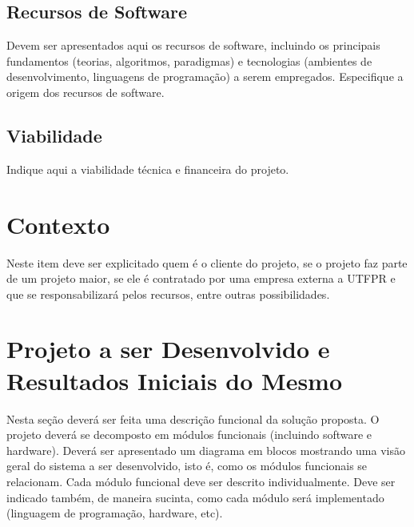 \documentclass[a4paper,12pt]{article}
\begin{document}
\subsection{Recursos de Software}
Devem ser apresentados aqui os recursos de software, incluindo os principais fundamentos (teorias, algoritmos, paradigmas) e tecnologias (ambientes de desenvolvimento, linguagens de programação) a serem empregados. Especifique a origem dos recursos de software.

\subsection{Viabilidade}
Indique aqui a viabilidade técnica e financeira do projeto.

\section{Contexto}
Neste item deve ser explicitado quem é o cliente do projeto, se o projeto faz parte de um projeto maior, se ele é contratado por uma empresa externa a UTFPR e que se responsabilizará pelos recursos, entre outras possibilidades.

\section{Projeto a ser Desenvolvido e Resultados Iniciais do Mesmo}
Nesta seção deverá ser feita uma descrição funcional da solução proposta. O projeto deverá se decomposto em módulos funcionais (incluindo software e hardware).
Deverá ser apresentado um diagrama em blocos mostrando uma visão geral do sistema a ser desenvolvido, isto é, como os módulos funcionais se relacionam.
Cada módulo funcional deve ser descrito individualmente.
Deve ser indicado também, de maneira sucinta, como cada módulo será implementado (linguagem de programação, hardware, etc).
\end{document}
